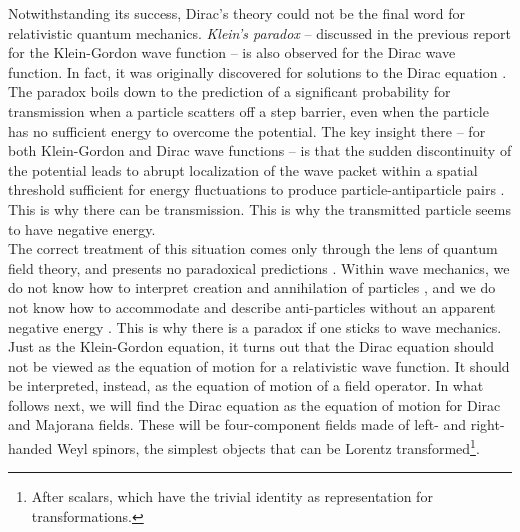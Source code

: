Notwithstanding its success, Dirac's theory could not be the final word for relativistic quantum mechanics. \textit{Klein's paradox} -- discussed in the previous report for the Klein-Gordon wave function -- is also observed for the Dirac wave function. In fact, it was originally discovered for solutions to the Dirac equation \cite{alvarez2011invitation}.  The paradox boils down to the prediction of a significant probability for transmission when a particle scatters off a step barrier, even when the particle has no sufficient energy to overcome the potential. The key insight there -- for both Klein-Gordon and Dirac wave functions -- is that the sudden discontinuity of the potential leads to abrupt localization of the wave packet within a spatial threshold sufficient for energy fluctuations to produce particle-antiparticle pairs \cite{padmanabhan2016quantum,alvarez2011invitation}. This is why there can be transmission. This is why the transmitted particle seems to have negative energy.\\

The correct treatment of this situation comes only through the lens of quantum field theory, and presents no paradoxical predictions \cite{alvarez2011invitation}. Within wave mechanics, we do not know how to interpret creation and annihilation of particles \cite{padmanabhan2016quantum}, and we do not know how to accommodate and describe anti-particles without an apparent negative energy \cite{lancaster2014quantum,alvarez2011invitation}. This is why there is a paradox if one sticks to wave mechanics.\\

Just as the Klein-Gordon equation, it turns out that the Dirac equation should not be viewed as the equation of motion for a relativistic wave function. It should be interpreted, instead, as the equation of motion of a field operator. In what follows next, we will find the Dirac equation as the equation of motion for Dirac and Majorana fields. These will be four-component fields made of left- and right-handed Weyl spinors, the simplest objects that can be Lorentz transformed\footnote{After scalars, which have the trivial identity as representation for transformations.}.
